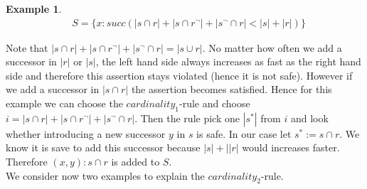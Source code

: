 \documentclass[a4paper,11pt]{scrartcl}
\theoremstyle{break}
\theoremstyle{definition}
\newtheorem{ex}{Example}
\begin{document}
\begin{ex}
\begin{align*}
&S=\{x:succ(|s\cap r|+|s\cap r^\neg|+|s^\neg\cap r|<|s|+|r|)\}
\end{align*}
\end{ex}
Note that $|s\cap r|+|s\cap r^\neg|+|s^\neg\cap r|=|s\cup r|$. No matter how often we add a successor in $|r|$ or $|s|$, the left hand side always increases as fast as the right hand side and therefore this assertion stays violated (hence it is not safe). However if we add a successor in $|s\cap r|$ the assertion becomes satisfied. Hence for this example we can choose the $cardinality_1$-rule and choose $i=|s\cap r|+|s\cap r^\neg|+|s^\neg\cap r|$. Then the rule pick one $|s^\ast|$ from $i$ and look whether introducing a new successor $y$ in $s$ is safe. In our case let $s^\ast:=s\cap r$. We know it is save to add this successor because $|s|+||r|$ would increases faster. Therefore $(x,y):s\cap r$ is added to $S$.\\
We consider now two examples to explain the $cardinality_2$-rule.
\end{document}
